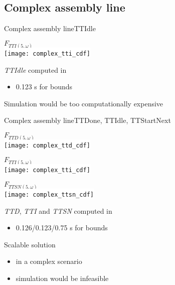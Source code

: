   \subsection{Complex assembly line}
    \begin{frame}{Complex assembly line}{TTIdle}
        \begin{center}
          $F_{TTI(5,\omega)}$\\
          \colorbox{white}{\texttt{[image: complex\_tti\_cdf]}}
        \end{center}
        
        \textit{TTIdle} computed in
        \begin{itemize}
          \item 0.123 s for bounds
        \end{itemize}
        Simulation would be too computationally expensive
    \end{frame}
  
    \begin{frame}{Complex assembly line}{TTDone, TTIdle, TTStartNext}
      \begin{minipage}{0.3\textwidth}
        \begin{center}
          {\tiny $F_{TTD(5,\omega)}$}\\
          \colorbox{white}{\texttt{[image: complex\_ttd\_cdf]}}
        \end{center}
      \end{minipage}
      \begin{minipage}{0.3\textwidth}
        \begin{center}
          {\tiny $F_{TTI(5,\omega)}$}\\
          \colorbox{white}{\texttt{[image: complex\_tti\_cdf]}}
        \end{center}
      \end{minipage}
      \begin{minipage}{0.3\textwidth}
        \begin{center}
          {\tiny $F_{TTSN(5,\omega)}$}\\
          \colorbox{white}{\texttt{[image: complex\_ttsn\_cdf]}}
        \end{center}
      \end{minipage}
      
      \vspace{4em}
      \begin{minipage}{0.5\textwidth}
        \textit{TTD}, \textit{TTI} and \textit{TTSN} computed in
        \begin{itemize}
          \item 0.126/0.123/0.75 s for bounds
        \end{itemize}
      \end{minipage}
      \begin{minipage}{0.45\textwidth}
        Scalable solution
        \begin{itemize}
          \item in a complex scenario
          \item simulation would be infeasible
        \end{itemize}
      \end{minipage}
    \end{frame}